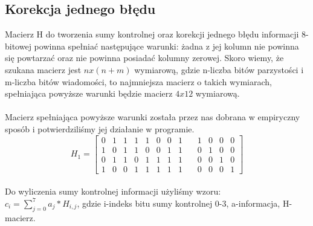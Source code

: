 \documentclass[a4paper, portrait,11pt]{article}
\begin{document}
\subsection*{Korekcja jednego błędu}
Macierz H do tworzenia sumy kontrolnej oraz korekcji jednego błędu informacji 8-bitowej 
powinna spełniać następujące warunki: żadna z jej kolumn nie powinna się powtarzać oraz nie powinna 
posiadać kolumny zerowej. Skoro wiemy, że szukana macierz jest $n x (n+m)$ wymiarową, gdzie 
n-liczba bitów parzystości i m-liczba bitów wiadomości, to najmniejsza macierz o takich wymiarach, 
spełniająca powyższe warunki będzie macierz $4 x 12$ wymiarową.\\
\\
Macierz spełniająca powyższe warunki została przez nas dobrana w empiryczny sposób i potwierdziliśmy 
jej działanie w programie.\\

$$H_1 = \left[\begin{array}{ccccccccccccc}
0 & 1 & 1 & 1 & 1 & 0 & 0 & 1 & \, & 1 & 0 & 0 & 0 \\
1 & 0 & 1 & 1 & 0 & 0 & 1 & 1 & \, & 0 & 1 & 0 & 0 \\
0 & 1 & 1 & 0 & 1 & 1 & 1 & 1 & \, & 0 & 0 & 1 & 0 \\
1 & 0 & 0 & 1 & 1 & 1 & 1 & 1 & \, & 0 & 0 & 0 & 1
\end{array}\right]$$
\\
Do wyliczenia sumy kontrolnej informacji użyliśmy wzoru:\\

$c_i = \displaystyle\sum_{j=0}^{7} a_j*H_{i,j}$, 
gdzie i-indeks bitu sumy kontrolnej {0-3}, a-informacja, H-macierz.\\
\\
\end{document}
